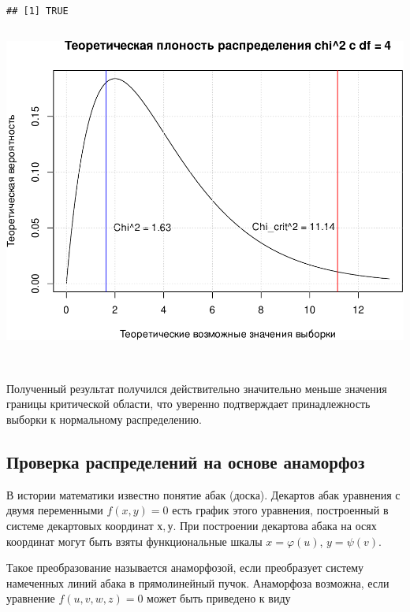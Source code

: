 \documentclass[
  14,
]{article}
\begin{document}
\begin{verbatim}
## [1] TRUE
\end{verbatim}

\[\ \]

\begin{center}\includegraphics[width=0.75\linewidth]{Prac3_files/figure-latex/unnamed-chunk-15-1} \end{center}

\(\ \)

Полученный результат получился действительно значительно меньше значения
границы критической области, что уверенно подтверждает принадлежность
выборки к нормальному распределению.

\hypertarget{ux43fux440ux43eux432ux435ux440ux43aux430-ux440ux430ux441ux43fux440ux435ux434ux435ux43bux435ux43dux438ux439-ux43dux430-ux43eux441ux43dux43eux432ux435-ux430ux43dux430ux43cux43eux440ux444ux43eux437}{%
\subsection{\texorpdfstring{\textbf{Проверка распределений на основе
анаморфоз}}{Проверка распределений на основе анаморфоз}}\label{ux43fux440ux43eux432ux435ux440ux43aux430-ux440ux430ux441ux43fux440ux435ux434ux435ux43bux435ux43dux438ux439-ux43dux430-ux43eux441ux43dux43eux432ux435-ux430ux43dux430ux43cux43eux440ux444ux43eux437}}

В истории математики известно понятие абак (доска). Декартов абак
уравнения с двумя переменными \(f(x,y) = 0\) есть график этого
уравнения, построенный в системе декартовых координат \(х, у\). При
построении декартова абака на осях координат могут быть взяты
функциональные шкалы \(x = φ(u)\), \(y = \psi (v)\).

Такое преобразование называется анаморфозой, если преобразует систему
намеченных линий абака в прямолинейный пучок. Анаморфоза возможна, если
уравнение \(f(u,v,w,z)=0\) может быть приведено к виду
\end{document}

